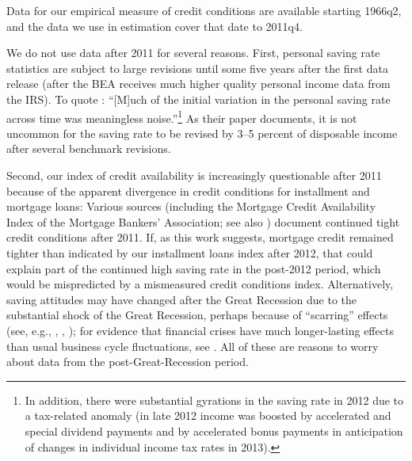 Data for our empirical measure of credit conditions are available starting 1966q2, and the data we use in estimation cover that date to 2011q4.

We do not use data after 2011 for several reasons. First, personal saving rate statistics are subject to large revisions until some five years  after the first data release (after the BEA receives much higher quality personal income data from the IRS).  To quote \cite{nsSavingRevisions}: ``[M]uch of the initial variation in the personal saving rate across time was meaningless noise.''\footnote{In addition, there were substantial gyrations in the saving rate in 2012 due to a tax-related anomaly (in late 2012 income was boosted by accelerated and special dividend payments and by accelerated bonus payments in anticipation of changes in individual income tax rates in 2013).} As  their paper documents, it is not uncommon for the saving rate to be revised by 3--5 percent of disposable income after several benchmark revisions.


Second, our index of credit availability is increasingly questionable after 2011 because of the apparent divergence in credit conditions for installment and mortgage loans: Various sources (including the Mortgage Credit Availability Index of the Mortgage Bankers' Association; see also \cite{bhutta_mortgageDebt}) document continued tight credit conditions after 2011.  If, as this work suggests, mortgage credit remained tighter than indicated by our installment loans index after 2012, that could explain part of the continued high saving rate in the post-2012 period, which would be mispredicted by a mismeasured credit conditions index.  Alternatively, saving attitudes may have changed after the Great Recession due to the substantial shock of the Great Recession, perhaps because of ``scarring'' effects  (see, e.g., \cite{malmendierSheng}, \cite{jstLeveragedBubbles}, \cite{hallQuantifying}); for evidence that financial crises have much longer-lasting effects than usual business cycle fluctuations, see \cite{rrAftermath}.  All of these are reasons to worry about data from the post-Great-Recession period.
